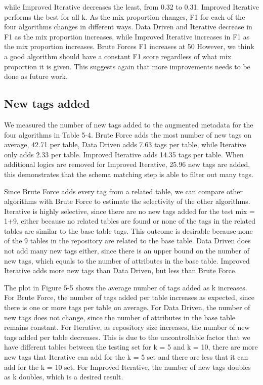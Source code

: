 while Improved Iterative decreases the least, from 0.32 to 0.31. Improved Iterative performs the best for all k. As the mix proportion changes, F1 for each of the four algorithms changes in different ways. Data Driven and Iterative decrease in F1 as the mix proportion increases, while Improved Iterative increases in F1 as the mix proportion increases. Brute Forces F1 increases at 50%
However, we think a good algorithm should have a constant F1 score regardless of what mix proportion it is given. This suggests again that more improvements needs to be done as future work.

\subsection{New tags added}

We measured the number of new tags added to the augmented metadata for the four algorithms in Table 5-4. Brute Force adds the most number of new tags on average, 42.71 per table, Data Driven adds 7.63 tags per table, while Iterative only adds 2.33 per table. Improved Iterative adds 14.35 tags per table. When additional logics are removed for Improved Iterative, 25.96 new tags are added, this demonstrates that the schema matching step is able to filter out many tags.

Since Brute Force adds every tag from a related table, we can compare other algorithms with Brute Force to estimate the selectivity of the other algorithms. Iterative is highly selective, since there are no new tags added for the test mix = 1+9, either because no related tables are found or none of the tags in the related tables are similar to the base table tags. This outcome is desirable because none of the 9 tables in the repository are related to the base table. Data Driven does not add many new tags either, since there is an upper bound on the number of new tags, which equals to the number of attributes in the base table. Improved Iterative adds more new tags than Data Driven, but less than Brute Force.

The plot in Figure 5-5 shows the average number of tags added as k increases. For Brute Force, the number of tags added per table increases as expected, since there is one or more tags per table on average. For Data Driven, the number of new tags does not change, since the number of attributes in the base table remains constant. For Iterative, as repository size increases, the number of new tags added per table decreases. This is due to the uncontrollable factor that we have different tables between the testing set for k = 5 and k = 10, there are more new tags that Iterative can add for the k = 5 set and there are less that it can add for the k = 10 set. For Improved Iterative, the number of new tags doubles as k doubles, which is a desired result.

